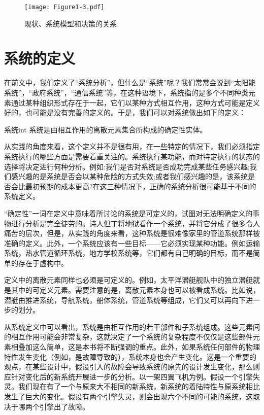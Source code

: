 \documentclass[cn,11pt,chinese]{elegantbook}
\begin{document}
\begin{figure}
	\centering
	\texttt{[image: Figure1-3.pdf]}
	\caption{现状、系统模型和决策的关系}\label{fig: fig1_3}
\end{figure}

\section{系统的定义}

在前文中，我们定义了“系统分析”，但什么是“系统”呢？我们常常会说到“太阳能系统”，“政府系统”，“通信系统”等，在这种语境下，系统指的是多个不同种类元素通过某种组织形式存在于一起，它们以某种方式相互作用，这种方式可能是定义好的，也可能是没有完善的定义的。于是，我们可以对系统做出如下的定义：

\begin{definition}{系统}{int}
系统是由相互作用的离散元素集合所构成的确定性实体。
\end{definition}

从实践的角度来看，这个定义并不是很有用，在一些特定的情况下，我们必须指定系统执行的哪些方面是需要着重关注的。系统执行某功能，而对特定执行的状态的选择将决定进行何种分析。例如:我们是否对系统是否成功完成某些任务感兴趣;我们感兴趣的是系统是否会以某种危险的方式失效;或者我们感兴趣的是，该系统是否会比最初预期的成本更高?在这三种情况下，正确的系统分析很可能基于不同的系统定义。

“确定性”一词在定义中意味着所讨论的系统是可定义的，试图对无法明确定义的事物进行分析是完全徒劳的。诗人但丁将地狱看作一个系统，并将它分成了很多令人痛苦的层次，但是，从实践的角度来看，这种系统是很难像家里的管道系统那样被准确的定义。此外，一个系统应该有一些目标——它必须实现某种功能。例如运输系统，热水管道循环系统，地方学校系统等，它们都有自己明确的目标，而不是简单的存在于虚构中。

定义中的离散元素同样也必须是可定义的。例如，太平洋潜艇舰队中的独立潜艇就是其中的可定义元素。需要注意的是，离散元素本身也可以被看成系统。比如说，潜艇由推进系统，导航系统，船体系统，管道系统等组成，它们又可以再向下进一步的划分。

从系统定义中可以看出，系统是由相互作用的若干部件和子系统组成。这些元素间的相互作用可能会非常复杂，这就决定了一个系统的复杂程度不仅仅是这些部件元素相叠加这么简单，这是本书将不断强调的重点。此外，如果系统任何部件的物理特性发生变化（例如，是故障导致的），系统本身也会产生变化。这是一个重要的观点，在某些设计中，假设引入的故障会导致系统的原先的设计发生变化，那么则应针对变化后的新系统开展进一步的分析。以一架四翼飞机为例。假设一个引擎失灵。我们现在有了一个与原来大不相同的新系统，新系统的着陆特性与原系统相比发生了巨大的变化。假设有两个引擎失灵，则会出现六个不同的可能的系统，这取决于哪两个引擎出了故障。
\end{document}
